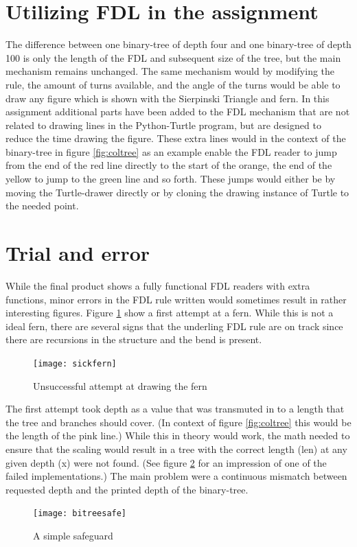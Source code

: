 \documentclass[titlepage]{article}
\begin{document}
\section{Utilizing FDL in the assignment}
The difference between one binary-tree of depth four and one binary-tree of depth 100 is only the length of the FDL and subsequent size of the tree, but the main mechanism remains unchanged.  The same mechanism would by modifying the rule, the amount of turns available, and the angle of the turns would be able to draw any figure which is shown with the Sierpinski Triangle and fern.  In this assignment additional parts have been added to the FDL mechanism that are not related to drawing lines in the Python-Turtle program, but are designed to reduce the time drawing the figure. These extra lines would in the context of the binary-tree in figure \ref{fig:coltree}  as an example enable the FDL reader to jump from the end of the red line directly to the start of the orange, the end of the yellow to jump to the green line and so forth. These jumps would either be by moving the Turtle-drawer directly or by cloning the drawing instance of Turtle to the needed point. 

\section{Trial and error}
While the final product shows a fully functional FDL readers with extra functions, minor errors in the FDL rule written would sometimes result in rather interesting figures. Figure \ref{fig:sickfern}  show a first attempt at a fern. While this is not a ideal fern, there are several signs that the underling FDL rule are on track since there are recursions in the structure and the bend is present. \par
\begin{figure}[H]
  \centering
  \texttt{[image: sickfern]}
  \caption{Unsuccessful attempt at drawing the fern}
  \label{fig:sickfern}
\end{figure}

The first attempt took depth as a value that was transmuted in to a length that the tree and branches should cover. (In context of figure \ref{fig:coltree}  this would be the length of the pink line.) 
While this in theory would work, the math needed to ensure that the scaling would result in a tree with the correct length (len) at any given depth (x) were not found. (See figure \ref{fig:bitreesafe}  for an impression of one of the failed implementations.) The main problem were a continuous mismatch between requested depth and the printed depth of the binary-tree. \par
\begin{figure}[H]
  \centering
  \texttt{[image: bitreesafe]}
  \caption{A simple safeguard}
  \label{fig:bitreesafe}
\end{figure}
\end{document}
